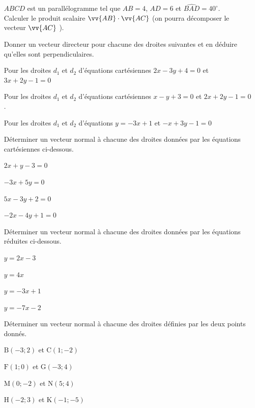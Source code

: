 \documentclass[11pt,a4paper]{article}  %
\begin{document}
\exerciceDS{}
$A B C D$ est un parallélogramme tel que $A B=4$, $A D=6$ et $\widehat{B A D}=40^{\circ}$.\\
Calculer le produit scalaire $\vv{A B} \cdot \vv{A C}$ (on pourra décomposer le vecteur $\vv{A C}$ ).

\exerciceDS{}

Donner un vecteur directeur pour chacune des droites suivantes et en déduire qu'elles sont perpendiculaires.
\begin{enumMet}
	\item Pour les droites $d_1$ et $d_2$ d'équations cartésiennes $2 x-3 y+4=0$ et $3 x+2 y-1=0$
	\item Pour les droites $d_1$ et $d_2$ d'équations cartésiennes $x-y+3=0$ et $2 x+2 y-1=0$.
	\item Pour les droites $d_1$ et $d_2$ d'équations $y=-3 x+1$ et $-x+3 y-1=0$
\end{enumMet}



\exerciceDS{}

Déterminer un vecteur normal à chacune des droites données par les équations cartésiennes ci-dessous.
\begin{enumMet}
	\item $2 x+y-3=0$
	\item $-3 x+5 y=0$
	\item $5 x-3 y+2=0$
	\item $-2 x-4 y+1=0$
\end{enumMet}

\exerciceDS{}

Déterminer un vecteur normal à chacune des droites données par les équations réduites ci-dessous.
\begin{enumMet}
	\item $y=2 x-3$
	\item $y=4 x$
	\item $y=-3 x+1$
	\item $y=-7 x-2$
\end{enumMet}

\exerciceDS{}

Déterminer un vecteur normal à chacune des droites définies par les deux points donnés.
\begin{enumMet}
	\item $\mathrm{B}(-3 ; 2)$ et $\mathrm{C}(1 ;-2)$
	\item $\mathrm{F}(1 ; 0)$ et $\mathrm{G}(-3 ; 4)$
	\item $\mathrm{M}(0 ;-2)$ et $\mathrm{N}(5 ; 4)$
	\item $\mathrm{H}(-2 ; 3)$ et $\mathrm{K}(-1 ;-5)$
\end{enumMet}
\end{document}
